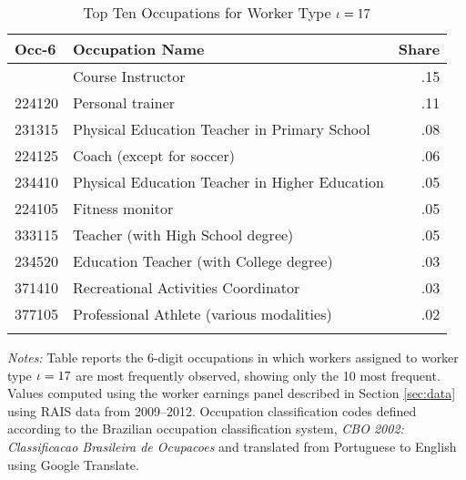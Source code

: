 \begin{table}[tbp] \centering
{}

\caption{Top Ten Occupations for Worker Type $\iota=17$}
\label{occ_counts_iota360}
\begin{tabularx}{\textwidth}{llr}

\toprule
{Occ-6}&{Occupation Name}&{Share} \tabularnewline
\midrule\addlinespace[1.5ex]
333110&Course Instructor&.15 \tabularnewline
224120&Personal trainer&.11 \tabularnewline
231315&Physical Education Teacher in Primary School&.08 \tabularnewline
224125&Coach (except for soccer)&.06 \tabularnewline
234410&Physical Education Teacher in Higher Education \hspace{2.12cm}&.05 \tabularnewline
224105&Fitness monitor&.05 \tabularnewline
333115&Teacher (with High School degree)&.05 \tabularnewline
234520&Education Teacher (with College degree) & .03 \tabularnewline
371410&Recreational Activities Coordinator&.03 \tabularnewline
377105&Professional Athlete (various modalities)&.02 \tabularnewline
\bottomrule \addlinespace[1.5ex]
\end{tabularx}
\footnotesize\flushleft \emph{Notes:} Table reports the 6-digit occupations in which workers assigned to worker type $\iota=17$ are most frequently observed, showing only the 10 most frequent. Values computed using the worker earnings panel described in Section \ref{sec:data} using RAIS data from 2009--2012. Occupation classification codes defined according to the Brazilian occupation classification system, \emph{CBO 2002: Classificacao Brasileira de Ocupacoes} and translated from Portuguese to English using Google Translate. 
\end{table}
